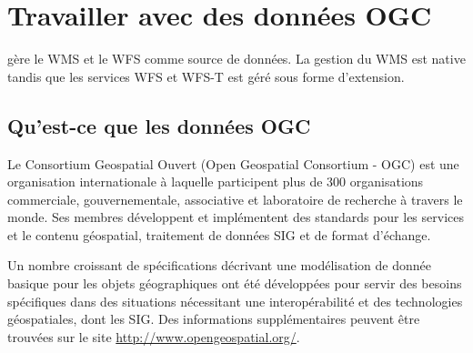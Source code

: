\chapter{Travailler avec des données OGC}


\qg gère le WMS et le WFS comme source de données. La gestion du WMS est native tandis que les services WFS et WFS-T est géré sous forme d'extension.

\section{Qu'est-ce que les données OGC}

Le Consortium Geospatial Ouvert (Open Geospatial Consortium - OGC) est une organisation internationale à laquelle participent plus de 300 organisations commerciale, gouvernementale, associative et laboratoire de recherche à travers  le monde. Ses membres développent et implémentent des standards pour les services et le contenu géospatial, traitement de données SIG et de format d'échange.


Un nombre croissant de spécifications décrivant une modélisation de donnée basique pour les objets géographiques ont été développées pour servir des besoins spécifiques dans des situations nécessitant une interopérabilité et des technologies géospatiales, dont les SIG. Des informations supplémentaires peuvent être trouvées sur le site
\url{http://www.opengeospatial.org/}.

